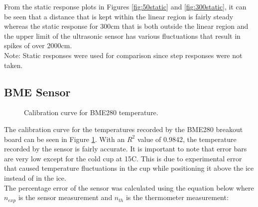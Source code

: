 \documentclass[11pt]{article}
\begin{document}
From the static response plots in Figures \ref{fig:50static} and \ref{fig:300static}, it can be seen that a distance that is kept within the linear region is fairly steady whereas the static response for 300cm that is both outside the linear region and the upper limit of the ultrasonic sensor has various fluctuations that result in spikes of over 2000cm.\\

Note: Static responses were used for comparison since step responses were not taken.

\pagebreak
\subsection{BME Sensor}

\begin{figure}[!ht]
\centering
{}
\caption{Calibration curve for BME280 temperature.}
\label{fig:temp_cal}
\end{figure}

The calibration curve for the temperatures recorded by the BME280 breakout board can be seen in Figure \ref{fig:temp_cal}. With an $R^{2}$ value of 0.9842, the temperature recorded by the sensor is fairly accurate. It is important to note that error bars are very low except for the cold cup at 15\textdegree C. This is due to experimental error that caused temperature fluctuations in the cup while positioning it above the ice instead of in the ice.\\

The percentage error of the sensor was calculated using the equation below where $n_{exp}$ is the sensor measurement and $n_{th}$ is the thermometer measurement:
\end{document}
